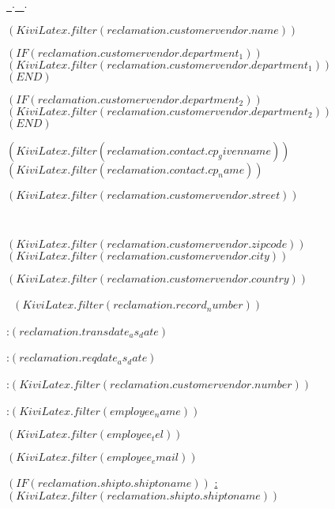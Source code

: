 \ourfont
\begin{minipage}[t]{8cm}
  \scriptsize

  {\color{gray}\underline{\firma\ $\cdot$ \strasse\ $\cdot$ \ort}}
  \normalsize

  \vspace*{0.3cm}

  $( KiviLatex.filter(reclamation.customervendor.name ) )$

  $( IF (reclamation.customervendor.department_1) )$$( KiviLatex.filter(reclamation.customervendor.department_1) )$\\$( END )$%

  $( IF (reclamation.customervendor.department_2) )$$( KiviLatex.filter(reclamation.customervendor.department_2) )$\\$( END )$%

  $( KiviLatex.filter(reclamation.contact.cp_givenname) )$ $( KiviLatex.filter(reclamation.contact.cp_name) )$

  $( KiviLatex.filter(reclamation.customervendor.street) )$

  ~
  
  $( KiviLatex.filter(reclamation.customervendor.zipcode) )$ $( KiviLatex.filter(reclamation.customervendor.city) )$

  $( KiviLatex.filter(reclamation.customervendor.country) )$
\end{minipage}
\hfill
\begin{minipage}[t]{6cm}
  \hfill{\LARGE\textbf{\ekreklamation}}

  \vspace*{0.2cm}

  \hfill{\large\textbf{\nr ~$( KiviLatex.filter(reclamation.record_number) )$}}

  \vspace*{0.2cm}

  \datum:\hfill $( reclamation.transdate_as_date )$

  \lieferdatum:\hfill $( reclamation.reqdate_as_date )$

  \kundennummer:\hfill $( KiviLatex.filter(reclamation.customervendor.number) )$

  \ansprechpartner:\hfill $( KiviLatex.filter(employee_name) )$

  \textTelefon \hfill $( KiviLatex.filter(employee_tel) )$

  \textEmail \hfill $( KiviLatex.filter(employee_email) )$
\end{minipage}

$( IF (reclamation.shipto.shiptoname) )$%
  \vspace{0.8cm}
  \scriptsize \underline{\abweichendeLieferadresse:}\\
  \normalsize    $( KiviLatex.filter(reclamation.shipto.shiptoname) )$

